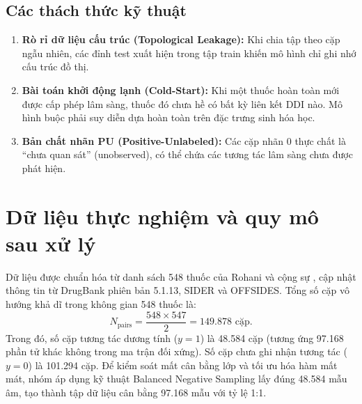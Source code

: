 \documentclass[12pt,a4paper,oneside]{report}
\begin{document}
\subsection{Các thách thức kỹ thuật}
\begin{enumerate}
  \item \textbf{Rò rỉ dữ liệu cấu trúc (Topological Leakage):} Khi chia tập theo cặp ngẫu nhiên, các đỉnh test xuất hiện trong tập train khiến mô hình chỉ ghi nhớ cấu trúc đồ thị.
  \item \textbf{Bài toán khởi động lạnh (Cold-Start):} Khi một thuốc hoàn toàn mới được cấp phép lâm sàng, thuốc đó chưa hề có bất kỳ liên kết DDI nào. Mô hình buộc phải suy diễn dựa hoàn toàn trên đặc trưng sinh hóa học.
  \item \textbf{Bản chất nhãn PU (Positive-Unlabeled):} Các cặp nhãn 0 thực chất là ``chưa quan sát'' (unobserved), có thể chứa các tương tác lâm sàng chưa được phát hiện.
\end{enumerate}

\section{Dữ liệu thực nghiệm và quy mô sau xử lý}
Dữ liệu được chuẩn hóa từ danh sách 548 thuốc của Rohani và cộng sự \cite{rohani2019}, cập nhật thông tin từ DrugBank phiên bản 5.1.13, SIDER và OFFSIDES.
Tổng số cặp vô hướng khả dĩ trong không gian 548 thuốc là:
\begin{equation}
  N_{\text{pairs}} = \frac{548 \times 547}{2} = 149.878\text{ cặp}.
\end{equation}
Trong đó, số cặp tương tác dương tính ($y=1$) là 48.584 cặp (tương ứng 97.168 phần tử khác không trong ma trận đối xứng). Số cặp chưa ghi nhận tương tác ($y=0$) là 101.294 cặp. Để kiểm soát mất cân bằng lớp và tối ưu hóa hàm mất mát, nhóm áp dụng kỹ thuật Balanced Negative Sampling lấy đúng 48.584 mẫu âm, tạo thành tập dữ liệu cân bằng 97.168 mẫu với tỷ lệ 1:1.
\end{document}
